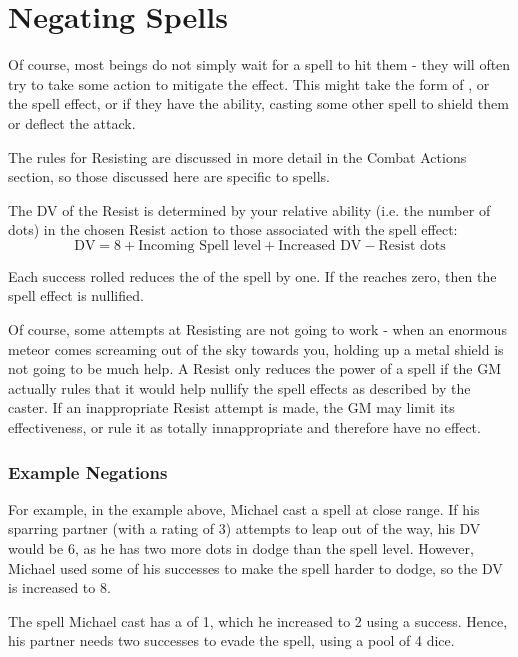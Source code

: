 \section{Negating Spells}

Of course, most beings do not simply wait for a spell to hit them - they will often try to take some action to mitigate the effect. This might take the form of ,  or  the spell effect, or if they have the ability, casting some other spell to shield them or deflect the attack. 

The rules for Resisting are discussed in more detail in the Combat Actions section, so those discussed here are specific to spells. 

The DV of the Resist is determined by your relative ability (i.e. the number of dots) in the chosen Resist action to those associated with the spell effect:
$$ \text{DV}  = 8 + \text{Incoming Spell level} + \text{Increased DV} - \text{Resist dots} $$

Each success rolled reduces the  of the spell by one. If the  reaches zero, then the spell effect is nullified. 


Of course, some attempts at Resisting are not going to work - when an enormous meteor comes screaming out of the sky towards you, holding up a metal shield is not going to be much help. A Resist only reduces the power of a spell if the GM actually rules that it would help nullify the spell effects as described by the caster. If an inappropriate Resist attempt is made, the GM may limit its effectiveness, or rule it as totally innappropriate and therefore have no effect. 

\subsubsection{Example Negations}

For example, in the example above, Michael cast a \levelOne{} spell at close range. If his sparring partner (with a  rating of 3) attempts to leap out of the way, his DV would be 6, as he has two more dots in dodge than the spell level. However, Michael used some of his successes to make the spell harder to dodge, so the DV is increased to 8. 

The spell Michael cast has a  of 1, which he increased to 2 using a success. Hence, his partner needs two successes to evade the spell, using a  pool of 4 dice. 

